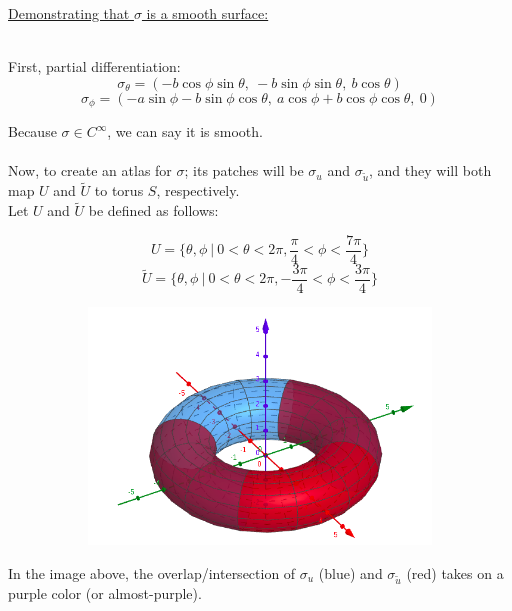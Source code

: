 \documentclass[12pt]{article}
\newcommand{\ulind}[1]
{
\noindent
\underline{#1}\\\\
\indent
}
\begin{document}
\clearpage

\ulind{Demonstrating that $\sigma$ is a smooth surface:}
First, partial differentiation:
$$
\sigma_\theta = (-b \cos \phi \sin \theta, \ -b \sin \phi \sin \theta, \ b \cos \theta )
$$
$$
\sigma_\phi = (-a \sin \phi - b \sin \phi \cos \theta, \ a \cos \phi + b \cos \phi \cos \theta, \ 0 )
$$

Because $\sigma \in C^\infty$, we can say it is smooth.\\\\
Now, to create an atlas for $\sigma$; its patches will be $\sigma_u$ and $\sigma_{\tilde u}$, and they will both map $U$ and $\widetilde{U}$ to torus $S$, respectively.\\
\indent
Let $U$ and $\widetilde{U}$ be defined as follows:

$$
U = \lbrace \theta,\phi \ | \ 0 < \theta < 2\pi, \frac{\pi}{4} < \phi < \frac{7\pi}{4} \rbrace
$$
$$
\widetilde U = \lbrace \theta,\phi \ | \ 0 < \theta < 2\pi, -\frac{3\pi}{4} < \phi < \frac{3\pi}{4} \rbrace
$$

\begin{figure}[h!]
\centering
	\begin{subfigure}[b]{0.5\linewidth}
		\includegraphics[width=\linewidth]{./assets/4-2-5/torus-atlas.png}
	\end{subfigure}
\end{figure}
\indent

In the image above, the overlap/intersection of $\sigma_u$ (blue) and $\sigma_{\tilde u}$ (red) takes on a purple color (or almost-purple).
\end{document}
